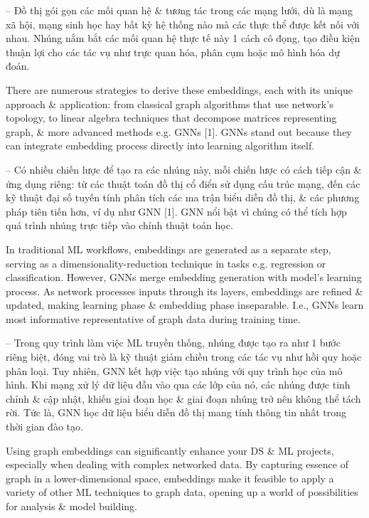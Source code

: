 \documentclass{article}
\begin{document}
\begin{itemize}
    -- Đồ thị gói gọn các mối quan hệ \& tương tác trong các mạng lưới, dù là mạng xã hội, mạng sinh học hay bất kỳ hệ thống nào mà các thực thể được kết nối với nhau. Nhúng nắm bắt các mối quan hệ thực tế này 1 cách cô đọng, tạo điều kiện thuận lợi cho các tác vụ như trực quan hóa, phân cụm hoặc mô hình hóa dự đoán.

    There are numerous strategies to derive these embeddings, each with its unique approach \& application: from classical graph algorithms that use network's topology, to linear algebra techniques that decompose matrices representing graph, \& more advanced methods e.g. GNNs [1]. GNNs stand out because they can integrate embedding process directly into learning algorithm itself.

    -- Có nhiều chiến lược để tạo ra các nhúng này, mỗi chiến lược có cách tiếp cận \& ứng dụng riêng: từ các thuật toán đồ thị cổ điển sử dụng cấu trúc mạng, đến các kỹ thuật đại số tuyến tính phân tích các ma trận biểu diễn đồ thị, \& các phương pháp tiên tiến hơn, ví dụ như GNN [1]. GNN nổi bật vì chúng có thể tích hợp quá trình nhúng trực tiếp vào chính thuật toán học.

    In traditional ML workflows, embeddings are generated as a separate step, serving as a dimensionality-reduction technique in tasks e.g. regression or classification. However, GNNs merge embedding generation with model's learning process. As network processes inputs through its layers, embeddings are refined \& updated, making learning phase \& embedding phase inseparable. I.e., GNNs learn most informative representative of graph data during training time.

    -- Trong quy trình làm việc ML truyền thống, nhúng được tạo ra như 1 bước riêng biệt, đóng vai trò là kỹ thuật giảm chiều trong các tác vụ như hồi quy hoặc phân loại. Tuy nhiên, GNN kết hợp việc tạo nhúng với quy trình học của mô hình. Khi mạng xử lý dữ liệu đầu vào qua các lớp của nó, các nhúng được tinh chỉnh \& cập nhật, khiến giai đoạn học \& giai đoạn nhúng trở nên không thể tách rời. Tức là, GNN học dữ liệu biểu diễn đồ thị mang tính thông tin nhất trong thời gian đào tạo.

    Using graph embeddings can significantly enhance your DS \& ML projects, especially when dealing with complex networked data. By capturing essence of graph in a lower-dimensional space, embeddings make it feasible to apply a variety of other ML techniques to graph data, opening up a world of possibilities for analysis \& model building.


\end{itemize}
\end{document}
